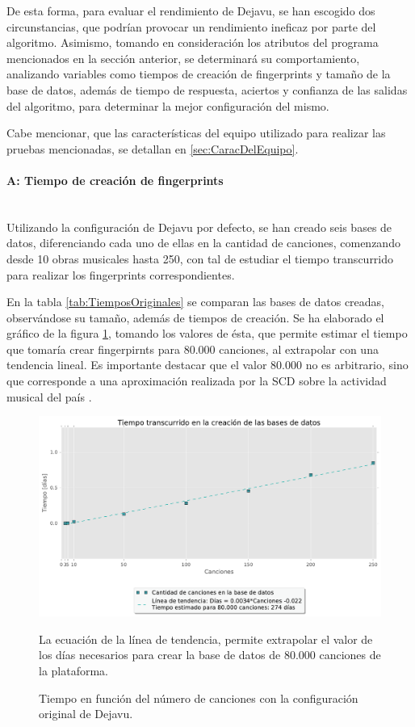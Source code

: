 De esta forma, para evaluar el rendimiento de Dejavu, se han escogido dos circunstancias, que podrían provocar un rendimiento ineficaz por parte del algoritmo. Asimismo, tomando en consideración los atributos del programa mencionados en la sección anterior, se determinará su comportamiento, analizando variables como tiempos de creación de fingerprints y tamaño de la base de datos, además de tiempo de respuesta, aciertos y confianza de las salidas del algoritmo, para determinar la mejor configuración del mismo.

Cabe mencionar, que las características del equipo utilizado para realizar las pruebas mencionadas, se detallan en \ref{sec:CaracDelEquipo}.

\paragraph{A: Tiempo de creación de fingerprints}\label{parrrafoTiempoCreacionF}\mbox{}\\

Utilizando la configuración de Dejavu por defecto, se han creado seis bases de datos, diferenciando cada uno de ellas en la cantidad de canciones, comenzando desde 10 obras musicales hasta 250, con tal de estudiar el tiempo transcurrido para realizar los fingerprints correspondientes.


En la tabla \ref{tab:TiemposOriginales} se comparan las bases de datos creadas, observándose su tamaño, además de tiempos de creación. Se ha elaborado el gráfico de la figura \ref{fig:TiempoFingerprintOriginales}, tomando los valores de ésta, que permite estimar el tiempo que tomaría crear fingerpirnts para 80.000 canciones, al extrapolar con una tendencia lineal. Es importante destacar que el valor 80.000 no es arbitrario, sino que corresponde a una aproximación realizada por la SCD sobre la actividad musical del país \cite{NumCanciones80k}.


\begin{figure}[h!]
    \centering
    \includegraphics[scale=0.6]{graficos/TiempoFingerprintOriginales.pdf}
    \caption{Tiempo en función del número de canciones con la configuración original de Dejavu.}{La ecuación de la línea de tendencia, permite extrapolar el valor de los días necesarios para crear la base de datos de 80.000 canciones de la plataforma.}
    \label{fig:TiempoFingerprintOriginales}
\end{figure}


